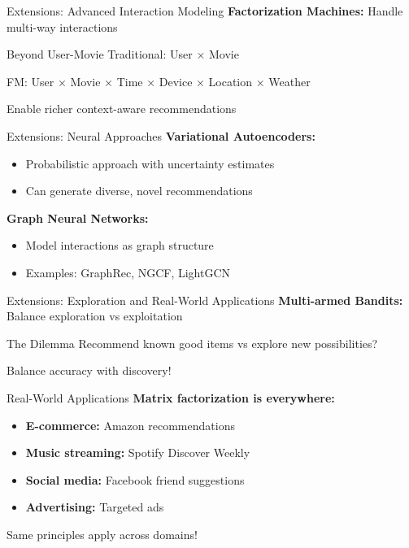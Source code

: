 \documentclass{beamer}
\begin{document}
\begin{frame}{Extensions: Advanced Interaction Modeling}
\textbf{Factorization Machines:} Handle multi-way interactions

\pause
\begin{examplebox}{Beyond User-Movie}
Traditional: User × Movie

FM: User × Movie × Time × Device × Location × Weather
\end{examplebox}

\pause
\begin{keypointsbox}{}
Enable richer context-aware recommendations
\end{keypointsbox}
\end{frame}

\begin{frame}{Extensions: Neural Approaches}
\textbf{Variational Autoencoders:}
\begin{itemize}[<+->]
    \item Probabilistic approach with uncertainty estimates
    \item Can generate diverse, novel recommendations
\end{itemize}

\pause
\textbf{Graph Neural Networks:}
\begin{itemize}[<+->]
    \item Model interactions as graph structure
    \item Examples: GraphRec, NGCF, LightGCN
\end{itemize}
\end{frame}

\begin{frame}{Extensions: Exploration and Real-World Applications}
\textbf{Multi-armed Bandits:} Balance exploration vs exploitation

\pause
\begin{alertbox}{The Dilemma}
Recommend known good items vs explore new possibilities?
\end{alertbox}

\pause
\begin{keypointsbox}{}
Balance accuracy with discovery!
\end{keypointsbox}
\end{frame}

\begin{frame}{Real-World Applications}
\textbf{Matrix factorization is everywhere:}

\pause
\begin{itemize}[<+->]
    \item \textbf{E-commerce:} Amazon recommendations
    \item \textbf{Music streaming:} Spotify Discover Weekly
    \item \textbf{Social media:} Facebook friend suggestions
    \item \textbf{Advertising:} Targeted ads
\end{itemize}

\pause
\begin{keypointsbox}{}
Same principles apply across domains!
\end{keypointsbox}
\end{frame}
\end{document}

